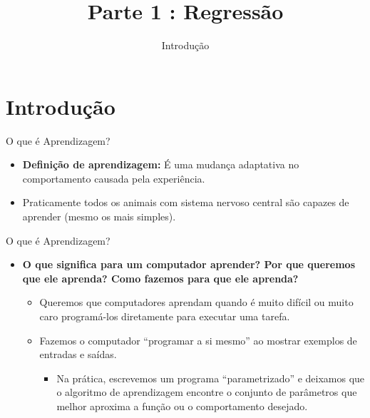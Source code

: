 \documentclass[
  ignorenonframetext,
  aspectratio=169,
]{beamer}
\title{Parte 1 : Regressão}
\subtitle{{Introdução}}
\author{}
\date{}
\providecommand{\tightlist}{%
  \setlength{\itemsep}{0pt}\setlength{\parskip}{0pt}}
\begin{document}
\frame{\titlepage}


\section{Introdução}\label{introduuxe7uxe3o}

\begin{frame}{O que é Aprendizagem?}
\label{o-que-uxe9-aprendizagem}
\begin{itemize}
\tightlist
\item
  \textbf{Definição de aprendizagem:} É uma mudança adaptativa no
  comportamento causada pela experiência.
\end{itemize}

\pause

\begin{itemize}
\tightlist
\item
  Praticamente todos os animais com sistema nervoso central são capazes
  de aprender (mesmo os mais simples).
\end{itemize}
\end{frame}

\begin{frame}{O que é Aprendizagem?}
\label{o-que-uxe9-aprendizagem-1}
\begin{itemize}
\tightlist
\item
  \textbf{O que significa para um computador aprender? Por que queremos
  que ele aprenda? Como fazemos para que ele aprenda?}

  \begin{itemize}
  \tightlist
  \item
    Queremos que computadores aprendam quando é muito difícil ou muito
    caro programá-los diretamente para executar uma tarefa.
  \item
    Fazemos o computador ``programar a si mesmo'' ao mostrar exemplos de
    entradas e saídas.

    \begin{itemize}
    \tightlist
    \item
      Na prática, escrevemos um programa ``parametrizado'' e deixamos
      que o algoritmo de aprendizagem encontre o conjunto de parâmetros
      que melhor aproxima a função ou o comportamento desejado.
    \end{itemize}
  \end{itemize}
\end{itemize}
\end{frame}
\end{document}
